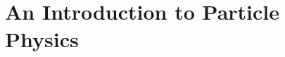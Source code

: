 \documentclass[11pt, twoside, a4paper]{book}
\begin{document}





  \tableofcontents
  \cleardoublepage




  \part{An Introduction to Particle Physics}

    
    \cleardoublepage

    
    \cleardoublepage











\end{document}
